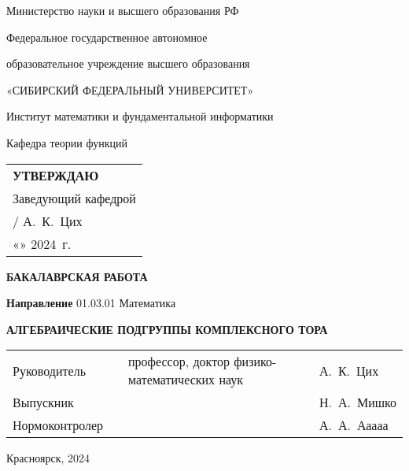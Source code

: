 \documentclass{article}
\begin{document}

\begin{titlepage}
  \centering
  Министерство науки и высшего образования РФ\par
  Федеральное государственное автономное\par
  образовательное учреждение высшего образования\par
  «СИБИРСКИЙ ФЕДЕРАЛЬНЫЙ УНИВЕРСИТЕТ»\par

  \vspace{0.3cm}
  Институт математики и фундаментальной информатики\par
  Кафедра теории функций\par

  \vspace{0.5cm}
  \begin{flushright}
    \begin{tabular}{l@{}}
      \textbf{УТВЕРЖДАЮ}\\
      Заведующий кафедрой\\
      \hspace{1.5cm} / А.~К.~Цих\\
      «\underline{\hspace{0.9cm}}» \underline{\hspace{1.5cm}} 2024 г.
    \end{tabular}
  \end{flushright}

  \vspace{2cm}
  \textbf{БАКАЛАВРСКАЯ РАБОТА}

  \vspace{0.7cm}
  \textbf{Направление} 01.03.01 Математика

  \vspace{0.7cm}
  \textbf{АЛГЕБРАИЧЕСКИЕ ПОДГРУППЫ КОМПЛЕКСНОГО ТОРА}

  \vspace{1.5cm}
  \begin{tabular}{lL{0.15\textwidth}L{0.35\textwidth}l}
    Руководитель   &  & профессор, доктор физико-математических наук & А.~К.~Цих   \rule{0pt}{23pt}\\
    Выпускник      &  &                                              & Н.~А.~Мишко \rule{0pt}{23pt}\\
    Нормоконтролер &  &                                              & А.~А.~Ааааа \rule{0pt}{28pt}
  \end{tabular}

  \vfill
  Красноярск, 2024
\end{titlepage}
\end{document}
